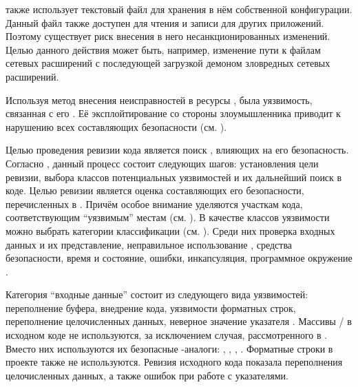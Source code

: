 %
 также использует текстовый файл для хранения в нём собственной конфигурации. 
%
Данный файл также доступен для чтения и записи для других приложений. 
%
Поэтому существует риск внесения в него несанкционированных изменений. 
%
Целью данного действия может быть, например, изменение пути к файлам сетевых расширений с последующей загрузкой демоном зловредных сетевых расширений.

%
Используя метод внесения неисправностей в ресурсы , была  уязвимость, связанная с его . 
%
Её эксплойтирование со стороны злоумышленника приводит к нарушению всех составляющих безопасности  (см. ).


%
Целью проведения ревизии кода  является поиск , влияющих на его безопасность.  
%
Согласно  , данный процесс состоит следующих шагов: установления цели ревизии, выбора классов потенциальных уязвимостей и их дальнейший поиск в коде. 
%
Целью ревизии  является оценка составляющих его безопасности, перечисленных в . 
%
Причём особое внимание уделяются участкам кода, соответствующим ``уязвимым'' местам (см. ). 
%
В качестве классов уязвимости можно выбрать категории классификации  (см. ). 
%
Среди них проверка входных данных и их представление, неправильное использование , средства безопасности, время и состояние, ошибки, инкапсуляция, программное окружение . 

%
Категория ``входные данные'' состоит из следующего вида уязвимостей: переполнение буфера, внедрение кода, уязвимости форматных строк, переполнение целочисленных данных, неверное значение указателя . 
%
Массивы / в исходном коде  не используются, за исключением случая, рассмотренного в . 
%
Вместо них используются их безопасные -аналоги: , , ,  . 
%
Форматные строки в проекте также не используются. 
%
Ревизия исходного кода показала  переполнения целочисленных данных, а также ошибок при работе с указателями. 

